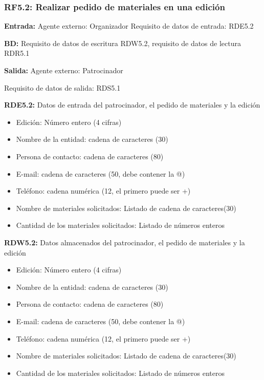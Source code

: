 \subsubsection{RF5.2: Realizar pedido de materiales en una edición}
\textbf{Entrada:} Agente externo: Organizador        Requisito de datos de entrada: RDE5.2

\textbf{BD:} Requisito de datos de escritura RDW5.2, requisito de datos de lectura RDR5.1

\textbf{Salida:} Agente externo: Patrocinador

Requisito de datos de salida: RDS5.1

\textbf{RDE5.2: }Datos de entrada del patrocinador, el pedido de materiales y la edición
\begin{itemize}
	\item Edición: Número entero (4 cifras)
\newline
	\item Nombre de la entidad: cadena de caracteres (30)
	\item Persona de contacto: cadena de caracteres (80)
	\item E-mail: cadena de caracteres (50, debe contener la @)
	\item Teléfono: cadena numérica (12, el primero puede ser +)
\newline
	\item Nombre de materiales solicitados: Listado de cadena de caracteres(30)
	\item Cantidad de los materiales solicitados: Listado de números enteros
\end{itemize}

\textbf{RDW5.2:} Datos almacenados del patrocinador, el pedido de materiales y la edición
\begin{itemize}
	\item Edición: Número entero (4 cifras)
\newline
	\item Nombre de la entidad: cadena de caracteres (30)
	\item Persona de contacto: cadena de caracteres (80)
	\item E-mail: cadena de caracteres (50, debe contener la @)
	\item Teléfono: cadena numérica (12, el primero puede ser +)
\newline
	\item Nombre de materiales solicitados: Listado de cadena de caracteres(30)
	\item Cantidad de los materiales solicitados: Listado de números enteros
\end{itemize}

